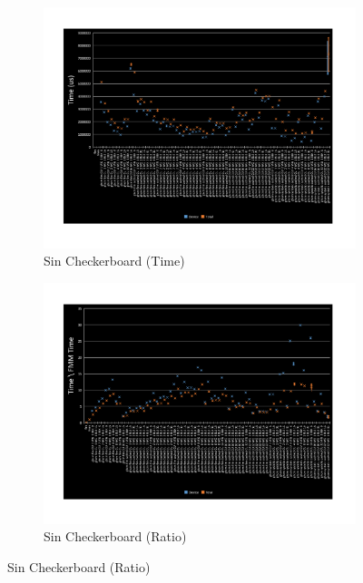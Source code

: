 \documentclass[11pt]{article}       %
\begin{document}
\begin{figure}
	\begin{subfigure}[b]{.4\columnwidth}
		\includegraphics[width=\textwidth]{Figures/time-sin-checkerboard}
		\caption{Sin Checkerboard (Time)}
	\end{subfigure}
	\begin{subfigure}[b]{.4\columnwidth}
		\includegraphics[width=\textwidth]{Figures/ratio-time-sin-checkerboard}
		\caption{Sin Checkerboard (Ratio)}
	\end{subfigure}


\end{figure}
\end{document}
